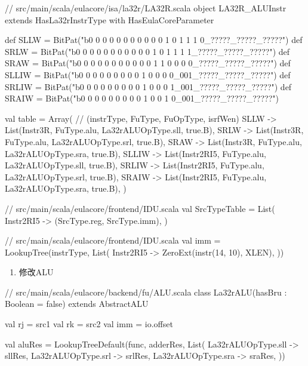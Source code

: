 \begin{CodeBlock}[language=BookScala]
// src/main/scala/eulacore/isa/la32r/LA32R.scala
object LA32R_ALUInstr extends HasLa32rInstrType with HasEulaCoreParameter {
  def SLLW    = BitPat("b0 0 0 0 0 0 0 0 0 0 0 1 0 1 1 1 0_?????_?????_?????")
  def SRLW    = BitPat("b0 0 0 0 0 0 0 0 0 0 0 1 0 1 1 1 1_?????_?????_?????")
  def SRAW    = BitPat("b0 0 0 0 0 0 0 0 0 0 0 1 1 0 0 0 0_?????_?????_?????")
  def SLLIW   = BitPat("b0 0 0 0 0 0 0 0 0 1 0 0 0 0_001_?????_?????_?????")
  def SRLIW   = BitPat("b0 0 0 0 0 0 0 0 0 1 0 0 0 1_001_?????_?????_?????")
  def SRAIW   = BitPat("b0 0 0 0 0 0 0 0 0 1 0 0 1 0_001_?????_?????_?????")

  val table = Array( // (instrType, FuType, FuOpType, isrfWen)
    SLLW        -> List(Instr3R, FuType.alu, La32rALUOpType.sll, true.B),
    SRLW        -> List(Instr3R, FuType.alu, La32rALUOpType.srl, true.B),
    SRAW        -> List(Instr3R, FuType.alu, La32rALUOpType.sra, true.B),
    SLLIW       -> List(Instr2RI5, FuType.alu, La32rALUOpType.sll, true.B),
    SRLIW       -> List(Instr2RI5, FuType.alu, La32rALUOpType.srl, true.B),
    SRAIW       -> List(Instr2RI5, FuType.alu, La32rALUOpType.sra, true.B),
  )
}
\end{CodeBlock}

\begin{CodeBlock}[language=BookScala]
// src/main/scala/eulacore/frontend/IDU.scala
val SrcTypeTable = List(
    Instr2RI5   -> (SrcType.reg, SrcType.imm),
)
\end{CodeBlock}

\begin{CodeBlock}[language=BookScala]
// src/main/scala/eulacore/frontend/IDU.scala
val imm = LookupTree(instrType, List(
    Instr2RI5     -> ZeroExt(instr(14, 10), XLEN),
))
\end{CodeBlock}

\begin{enumerate}
\def\labelenumi{\arabic{enumi}.}
\setcounter{enumi}{1}
\tightlist
\item
  修改ALU
\end{enumerate}

\begin{CodeBlock}[language=BookScala]
// src/main/scala/eulacore/backend/fu/ALU.scala
class La32rALU(hasBru : Boolean = false) extends AbstractALU {

  val rj = src1
  val rk = src2
  val imm = io.offset

  val aluRes = LookupTreeDefault(func, adderRes, List(
      La32rALUOpType.sll   -> sllRes,
      La32rALUOpType.srl   -> srlRes,
      La32rALUOpType.sra   -> sraRes,
  ))
}
\end{CodeBlock}

